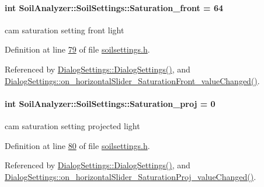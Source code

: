 \hypertarget{class_soil_analyzer_1_1_soil_settings_aacd4da6bfa26ee6aaec3d57c6653ac09}{}
\paragraph[{Saturation\+\_\+front}]{\setlength{\rightskip}{0pt plus 5cm}int Soil\+Analyzer\+::\+Soil\+Settings\+::\+Saturation\+\_\+front = 64}\label{class_soil_analyzer_1_1_soil_settings_aacd4da6bfa26ee6aaec3d57c6653ac09}
cam saturation setting front light 

Definition at line \hyperlink{soilsettings_8h_source_l00079}{79} of file \hyperlink{soilsettings_8h_source}{soilsettings.\+h}.



Referenced by \hyperlink{dialogsettings_8cpp_source_l00005}{Dialog\+Settings\+::\+Dialog\+Settings()}, and \hyperlink{dialogsettings_8cpp_source_l00319}{Dialog\+Settings\+::on\+\_\+horizontal\+Slider\+\_\+\+Saturation\+Front\+\_\+value\+Changed()}.

\hypertarget{class_soil_analyzer_1_1_soil_settings_a6157c2f85f3249e49617f23343076909}{}
\paragraph[{Saturation\+\_\+proj}]{\setlength{\rightskip}{0pt plus 5cm}int Soil\+Analyzer\+::\+Soil\+Settings\+::\+Saturation\+\_\+proj = 0}\label{class_soil_analyzer_1_1_soil_settings_a6157c2f85f3249e49617f23343076909}
cam saturation setting projected light 

Definition at line \hyperlink{soilsettings_8h_source_l00080}{80} of file \hyperlink{soilsettings_8h_source}{soilsettings.\+h}.



Referenced by \hyperlink{dialogsettings_8cpp_source_l00005}{Dialog\+Settings\+::\+Dialog\+Settings()}, and \hyperlink{dialogsettings_8cpp_source_l00351}{Dialog\+Settings\+::on\+\_\+horizontal\+Slider\+\_\+\+Saturation\+Proj\+\_\+value\+Changed()}.

\hypertarget{class_soil_analyzer_1_1_soil_settings_a115a9feb41cc836d28d4ae1ceb536356}{}
